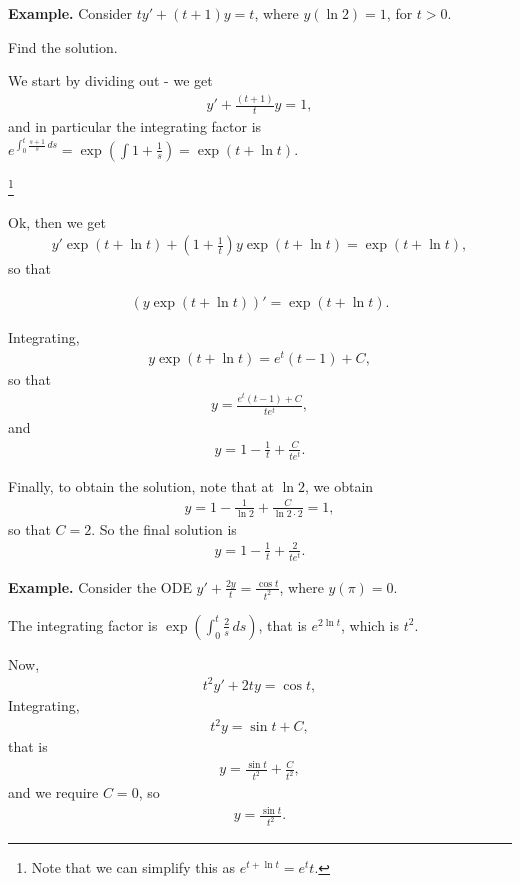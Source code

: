 \documentclass{article}
\begin{document}
{\bf Example.} Consider $t y' + (t+1) y = t$, where $y(\ln 2) = 1$, for $t > 0$.

Find the solution.


We start by dividing out - we get
\begin{align*}
  y' + \frac{(t+1)}{t} y = 1,
\end{align*}
and in particular the integrating factor is $e^{\int_{0}^{t} \frac{s+1}{s} \, ds} = \exp \left( \int 1 + \frac{1}{s} \right) = \exp \left( t + \ln t \right)$.

\footnote{Note that we can simplify this as $e^{t + \ln t} = e^t t$.}

Ok, then we get
\begin{align*}
  y' \exp (t + \ln t) + \left( 1 + \frac{1}{t} \right) y \exp (t + \ln t) = \exp (t + \ln t),
\end{align*}
so that

\begin{align*}
  (y \exp (t+ \ln t))' = \exp(t + \ln t).
\end{align*}

Integrating,
\begin{align*}
  y \exp (t + \ln t) = e^t (t-1) + C,
\end{align*}
so that
\begin{align*}
  y = \frac{e^t (t-1) + C}{t e^t},
\end{align*}
and
\begin{align*}
  y = 1 - \frac{1}{t} + \frac{C}{te^t}.
\end{align*}

Finally, to obtain the solution, note that at $\ln 2$, we obtain
\begin{align*}
  y = 1 - \frac{1}{\ln 2} + \frac{C}{\ln 2 \cdot 2} = 1,
\end{align*}
so that $C = 2$.  So the final solution is
\begin{align*}
  y = 1 - \frac{1}{t} + \frac{2}{t e^t}.
\end{align*}

{\bf Example.} Consider the ODE $y' + \frac{2y}{t} = \frac{\cos t}{t^2}$, where $y(\pi) = 0$.

The integrating factor is $\exp \left( \int_{0}^{t} \frac{2}{s} \, ds \right)$, that is $e^{2 \ln t}$, which is $t^2$.

Now,
\begin{align*}
  t^2 y' + 2ty = \cos t,
\end{align*}
Integrating,
\begin{align*}
  t^2 y = \sin t + C,
\end{align*}
that is
\begin{align*}
  y = \frac{\sin t}{t^2} + \frac{C}{t^2},
\end{align*}
and we require $C = 0$, so 
\begin{align*}
  y = \frac{\sin t}{t^2}.
\end{align*}
\end{document}
